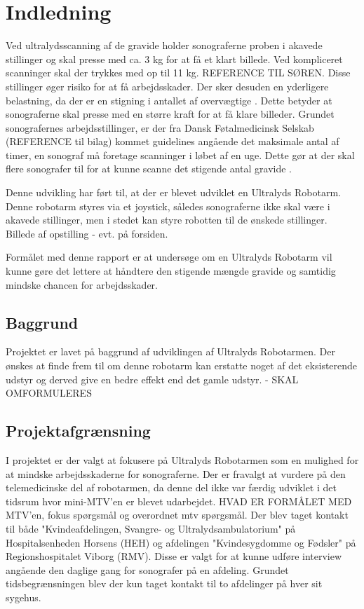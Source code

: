 \chapter{Indledning} 
Ved ultralydsscanning af de gravide holder sonograferne proben i akavede stillinger og skal presse med ca. 3 kg for at få et klart billede. Ved kompliceret scanninger skal der trykkes med op til 11 kg. REFERENCE TIL SØREN. Disse stillinger øger risiko for at få arbejdsskader. Der sker desuden en yderligere belastning, da der er en stigning i antallet af overvægtige \cite{Overvaegt}. Dette betyder at sonograferne skal presse med en større kraft for at få klare billeder. Grundet sonografernes arbejdsstillinger, er der fra Dansk Føtalmedicinsk Selskab (REFERENCE til bilag) kommet guidelines angående det maksimale antal af timer, en sonograf må foretage scanninger i løbet af en uge. Dette gør at der skal flere sonografer til for at kunne scanne det stigende antal gravide \cite{Foedsler}.

Denne udvikling har ført til, at der er blevet udviklet en Ultralyds Robotarm. Denne robotarm styres via et joystick, således sonograferne ikke skal være i akavede stillinger, men i stedet kan styre robotten til de ønskede stillinger. 
Billede af opstilling - evt. på forsiden.  

Formålet med denne rapport er at undersøge om en Ultralyds Robotarm vil kunne gøre det lettere at håndtere den stigende mængde gravide og samtidig mindske chancen for arbejdsskader.  

\section{Baggrund}
Projektet er lavet på baggrund af udviklingen af Ultralyds Robotarmen. Der ønskes at finde frem til om denne robotarm kan erstatte noget af det eksisterende udstyr og derved give en bedre effekt end det gamle udstyr. - SKAL OMFORMULERES 


\section{Projektafgrænsning}
 I projektet er der valgt at fokusere på Ultralyds Robotarmen som en mulighed for at mindske arbejdsskaderne for sonograferne. Der er fravalgt at vurdere på den telemedicinske del af robotarmen, da denne del ikke var færdig udviklet i det tidsrum hvor mini-MTV'en er blevet udarbejdet. HVAD ER FORMÅLET MED MTV'en, fokus spørgsmål og overordnet mtv spørgsmål. 
 Der blev taget kontakt til både "Kvindeafdelingen, Svangre- og Ultralydsambulatorium" på Hospitalsenheden Horsens (HEH) og afdelingen "Kvindesygdomme og Fødsler" på Regionshospitalet Viborg (RMV). Disse er valgt for at kunne udføre interview angående den daglige gang for sonografer på en afdeling. Grundet tidsbegrænsningen blev der kun taget kontakt til to afdelinger på hver sit sygehus. 

\label{version_Systemark}
